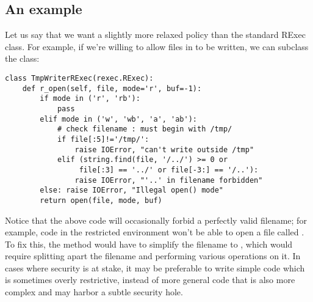 \subsection{An example}

Let us say that we want a slightly more relaxed policy than the
standard RExec class.  For example, if we're willing to allow files in
 to be written, we can subclass the  class:

\bcode\begin{verbatim}
class TmpWriterRExec(rexec.RExec):
    def r_open(self, file, mode='r', buf=-1):
        if mode in ('r', 'rb'):
            pass
        elif mode in ('w', 'wb', 'a', 'ab'):
            # check filename : must begin with /tmp/
            if file[:5]!='/tmp/': 
                raise IOError, "can't write outside /tmp"
            elif (string.find(file, '/../') >= 0 or
                 file[:3] == '../' or file[-3:] == '/..'):
                raise IOError, "'..' in filename forbidden"
        else: raise IOError, "Illegal open() mode"
        return open(file, mode, buf)
\end{verbatim}\ecode
%
Notice that the above code will occasionally forbid a perfectly valid
filename; for example, code in the restricted environment won't be
able to open a file called .  To fix this, the
 method would have to simplify the filename to
, which would require splitting apart the filename and
performing various operations on it.  In cases where security is at
stake, it may be preferable to write simple code which is sometimes
overly restrictive, instead of more general code that is also more
complex and may harbor a subtle security hole.
